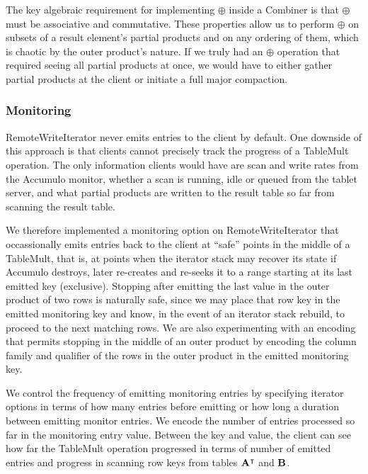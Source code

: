 The key algebraic requirement for implementing $\oplus$ inside a Combiner
is that $\oplus$ must be associative and commutative.
These properties allow us to perform $\oplus$ on subsets of a result element's partial products 
and on any ordering of them, which is chaotic by the outer product's nature.
If we truly had an $\oplus$ operation that required seeing all partial products at once,
we would have to either gather partial products at the client or initiate a full major compaction.


\subsubsection{Monitoring}
RemoteWriteIterator never emits entries to the client by default. 
One downside of this approach is that clients cannot precisely track the progress of a TableMult operation.
The only information clients would have are scan and write rates from the Accumulo monitor,
whether a scan is running, idle or queued from the tablet server, and what partial products 
are written to the result table so far from scanning the result table.

We therefore implemented a monitoring option on RemoteWriteIterator that occassionally emits entries
back to the client at ``safe'' points in the middle of a TableMult, that is,
at points when the iterator stack may recover its state if Accumulo destroys, later re-creates and re-seeks it
to a range starting at its last emitted key (exclusive).
Stopping after emitting the last value in the outer product of two rows is naturally safe, since we may place that row key
in the emitted monitoring key and know, in the event of an iterator stack rebuild, to proceed to the next matching rows.
We are also experimenting with an encoding that permits stopping in the middle of an outer product by encoding the 
column family and qualifier of the rows in the outer product in the emitted monitoring key.

We control the frequency of emitting monitoring entries by specifying iterator options in terms of how many entries
before emitting or how long a duration between emitting monitor entries. We encode the number of entries processed so far 
in the monitoring entry value. Between the key and value, the client can see how far the TableMult operation progressed
in terms of number of emitted entries and progress in scanning row keys from tables $\mathbf{A^{\intercal}}$ and $\mathbf{B}$.

